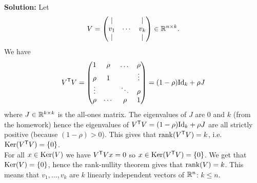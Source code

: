 \documentclass[11pt,nocut]{article}
\begin{document}
\textbf{Solution:}
Let
$$
V=
\begin{pmatrix}
	| & & | \\
	v_1 & \cdots & v_k \\
	| & & | 
\end{pmatrix}
\in \mathbb{R}^{n \times k}.
$$
We have
$$
V^{{\sf T}} V =
\begin{pmatrix}
	1 & \rho & \dots & \rho \\
	\rho & 1 & & \vdots \\
	\vdots &  & \ddots & \rho \\
	\rho & \cdots & \rho & 1 \\
\end{pmatrix}
= (1-\rho) {{\rm Id}}_k + \rho J
$$
where $J\in \mathbb{R}^{k \times k}$ is the all-ones matrix. The eigenvalues of $J$ are $0$ and $k$ (from the homework) hence the eigenvalues of $V^{{\sf T}} V = (1-\rho) {{\rm Id}}_k + \rho J$ are all strictly positive (because $(1-\rho) > 0$). This gives that ${{\rm rank}}(V^{{\sf T}}V) = k$, i.e.\ ${{\rm Ker}}(V^{{\sf T}}V) = \{0\}$.
\\

For all $x \in {{\rm Ker}}(V)$ we have $V^{{\sf T}}V x = 0$ so $x \in {{\rm Ker}}(V^{{\sf T}}V) = \{0\}$. We get that ${{\rm Ker}}(V)= \{0\}$, hence the rank-nullity theorem gives that ${{\rm rank}}(V) = k$. This means that $v_1, \dots, v_k$ are $k$ linearly independent vectors of $\mathbb{R}^n$: $k \leq n$.




\vspace{1cm}
\centerline{}

%
%
\end{document}
